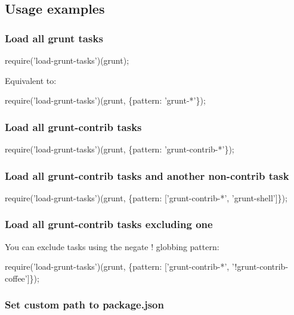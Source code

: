 \subsection*{Usage examples}

\subsubsection*{Load all grunt tasks}


\begin{DoxyCode}
require('load-grunt-tasks')(grunt);
\end{DoxyCode}


Equivalent to\+:


\begin{DoxyCode}
require('load-grunt-tasks')(grunt, \{pattern: 'grunt-*'\});
\end{DoxyCode}


\subsubsection*{Load all grunt-\/contrib tasks}


\begin{DoxyCode}
require('load-grunt-tasks')(grunt, \{pattern: 'grunt-contrib-*'\});
\end{DoxyCode}


\subsubsection*{Load all grunt-\/contrib tasks and another non-\/contrib task}


\begin{DoxyCode}
require('load-grunt-tasks')(grunt, \{pattern: ['grunt-contrib-*', 'grunt-shell']\});
\end{DoxyCode}


\subsubsection*{Load all grunt-\/contrib tasks excluding one}

You can exclude tasks using the negate {\ttfamily !} globbing pattern\+:


\begin{DoxyCode}
require('load-grunt-tasks')(grunt, \{pattern: ['grunt-contrib-*', '!grunt-contrib-coffee']\});
\end{DoxyCode}


\subsubsection*{Set custom path to package.\+json}


